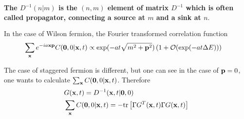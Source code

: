 \textbf{The $D^{-1}(n|m)$ is the $(n,m)$ element of matrix $D^{-1}$ which is often called propagator, connecting a source at $m$ and a sink at $n$}.

In the case of Wilson fermion, the Fourier transformed correlation function
\begin{equation}
\begin{split}
&\sum _{\bf x} e^{-i a{\bf x} {\bf p}}C({\bf 0},0|{\bf x},t)\propto \exp (-a t \sqrt{m^2+{\bf p}^2})\left(1+\mathcal{O}(\exp (-a t \Delta E))\right)
\end{split}
\end{equation}

The case of staggered fermion is different, but one can see in the case of ${\bf p}=0$, one wants to calculate $\sum _{\bf x} C({\bf 0},0|{\bf x},t)$. Therefore
\begin{equation}
\begin{split}
&G({\bf x},t)= D^{-1}({\bf x},t|{\bf 0},0)\\
&\sum _{\bf x}C({\bf 0},0|{\bf x},t) = -{\rm tr}\left[\Gamma G^T({\bf x},t) \Gamma G({\bf x},t)\right]
\end{split}
\end{equation}

